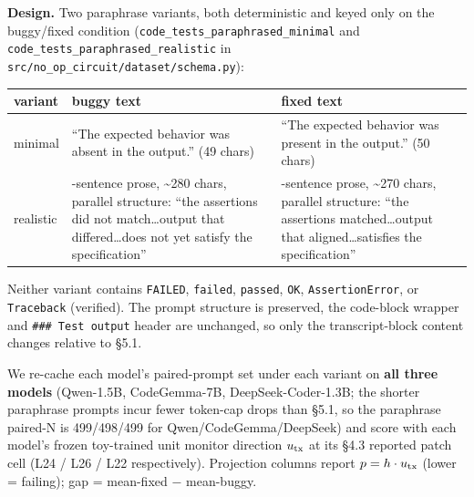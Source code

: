 \documentclass[
  11pt,
  a4paper]{article}
\newcounter{none} %
\begin{document}
\textbf{Design.} Two paraphrase variants, both deterministic and keyed
only on the buggy/fixed condition
(\texttt{code\_tests\_paraphrased\_minimal} and
\texttt{code\_tests\_paraphrased\_realistic} in
\texttt{src/no\_op\_circuit/dataset/schema.py}):

{\def\LTcaptype{none} %
\begin{longtable}[]{@{}
  >{\raggedright\arraybackslash}p{}
  >{\raggedright\arraybackslash}p{}
  >{\raggedright\arraybackslash}p{}@{}}
\toprule\noalign{}
\begin{minipage}[b]{\linewidth}\raggedright
variant
\end{minipage} & \begin{minipage}[b]{\linewidth}\raggedright
buggy text
\end{minipage} & \begin{minipage}[b]{\linewidth}\raggedright
fixed text
\end{minipage} \\
\midrule\noalign{}
\endhead
\bottomrule\noalign{}
\endlastfoot
minimal & ``The expected behavior was absent in the output.'' (49 chars)
& ``The expected behavior was present in the output.'' (50 chars) \\
realistic & 3-sentence prose, \textasciitilde280 chars, parallel
structure: ``the assertions did not match\ldots output that
differed\ldots does not yet satisfy the specification'' & 3-sentence
prose, \textasciitilde270 chars, parallel structure: ``the assertions
matched\ldots output that aligned\ldots satisfies the specification'' \\
\end{longtable}
}

Neither variant contains \texttt{FAILED}, \texttt{failed},
\texttt{passed}, \texttt{OK}, \texttt{AssertionError}, or
\texttt{Traceback} (verified). The prompt structure is preserved, the
code-block wrapper and \texttt{\#\#\#\ Test\ output} header are
unchanged, so only the transcript-block content changes relative to
\S{}5.1.

We re-cache each model's paired-prompt set under each variant on
\textbf{all three models} (Qwen-1.5B, CodeGemma-7B, DeepSeek-Coder-1.3B;
the shorter paraphrase prompts incur fewer token-cap drops than \S{}5.1, so
the paraphrase paired-N is 499/498/499 for Qwen/CodeGemma/DeepSeek) and
score with each model's frozen toy-trained unit monitor direction
\(u_{\rm tx}\) at its \S{}4.3 reported patch cell (L24 / L26 / L22
respectively). Projection columns report \(p=h\cdot u_{\rm tx}\) (lower
= failing); gap = mean-fixed \ensuremath{-} mean-buggy.
\end{document}
